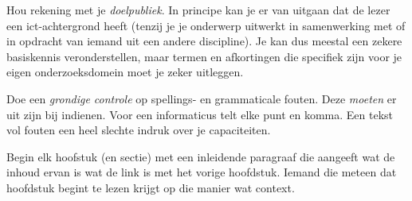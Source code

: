 

%

Hou rekening met je \emph{doelpubliek}. In principe kan je er van uitgaan dat de lezer een ict-achtergrond heeft (tenzij je je onderwerp uitwerkt in samenwerking met of in opdracht van iemand uit een andere discipline). Je kan dus meestal een zekere basiskennis veronderstellen, maar termen en afkortingen die specifiek zijn voor je eigen onderzoeksdomein moet je zeker uitleggen.

Doe een \emph{grondige controle} op spellings- en grammaticale fouten. Deze \emph{moeten} er uit zijn bij indienen. Voor een informaticus telt elke punt en komma. Een tekst vol fouten een heel slechte indruk over je capaciteiten.

Begin elk hoofstuk (en sectie) met een inleidende paragraaf die aangeeft wat de inhoud ervan is wat de link is met het vorige hoofdstuk. Iemand die meteen dat hoofdstuk begint te lezen krijgt op die manier wat context.




%


